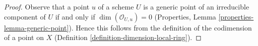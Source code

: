 \documentclass[10pt,a4paper]{amsart}
\theoremstyle{plain}
\theoremstyle{definition}
\theoremstyle{remark}
\numberwithin{equation}{subsection}
\begin{document}
\begin{proof}
Observe that a point $u$ of a scheme $U$ is a generic point of an
irreducible component of $U$ if and only if $\dim(\mathcal{O}_{U, u}) = 0$
(Properties, Lemma \ref{properties-lemma-generic-point}).
Hence this follows from the definition of the codimension of a
point on $X$ (Definition \ref{definition-dimension-local-ring}).
\end{proof}
\end{document}
